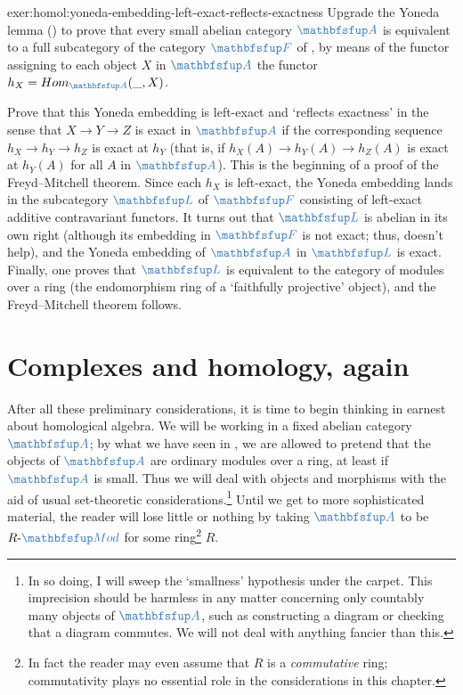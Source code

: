 \begin{exer}{}{exer:homol:yoneda-embedding-left-exact-reflects-exactness}
  Upgrade the Yoneda lemma () to prove
  that every small abelian category $\categ{A}$ is equivalent to a
  full subcategory of the category $\categ{F}$ of
  ,
  by means of the functor assigning to each object $X$ in $\categ{A}$
  the functor $h_X = \Hom_{\categ{A}}(\_, X)$.

  Prove that this Yoneda embedding is left-exact and `reflects
  exactness' in the sense that $X \to Y \to Z$ is exact in $\categ{A}$
  if the corresponding sequence $h_X \to h_Y \to h_Z$ is exact at
  $h_Y$ (that is, if $h_X(A) \to h_Y(A) \to h_Z(A)$ is exact at
  $h_Y(A)$ for all $A$ in $\categ{A}$).  This is the beginning of a
  proof of the Freyd--Mitchell theorem.  Since each $h_X$ is
  left-exact, the Yoneda embedding lands in the subcategory
  $\categ{L}$ of $\categ{F}$ consisting of left-exact additive
  contravariant functors. It turns out that $\categ{L}$ is abelian in
  its own right (although its embedding in $\categ{F}$ is not exact;
  thus, 
  doesn't help), and the Yoneda embedding of $\categ{A}$ in
  $\categ{L}$ is exact. Finally, one proves that $\categ{L}$ is
  equivalent to the category of modules over a ring (the endomorphism
  ring of a `faithfully projective' object), and the Freyd--Mitchell
  theorem follows.
\end{exer}

\section{Complexes and homology, again}
\label{sec:homol:complexes-and-homology-again}

After all these preliminary considerations, it is time to begin
thinking in earnest about homological algebra. We will be working in a
fixed abelian category $\categ{A}$; by what we have seen in
, we are allowed to
pretend that the objects of $\categ{A}$ are ordinary modules over a
ring, at least if $\categ{A}$ is small. Thus we will deal with objects
and morphisms with the aid of usual set-theoretic
considerations.\footnote{In so doing, I will sweep the `smallness'
  hypothesis under the carpet. This imprecision should be harmless in
  any matter concerning only countably many objects of $\categ{A}$,
  such as constructing a diagram or checking that a diagram
  commutes. We will not deal with anything fancier than this.} Until
we get to more sophisticated material, the reader will lose little or
nothing by taking $\categ{A}$ to be $R\text{-}\categ{Mod}$ for some
ring\footnote{In fact the reader may even assume that $R$ is a
  \emph{commutative} ring; commutativity plays no essential role in
  the considerations in this chapter.} $R$.

